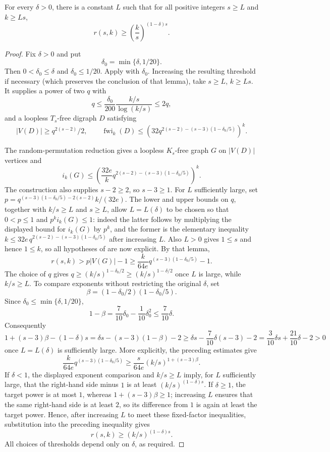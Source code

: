 \begin{theorem}
For every $\delta>0$, there is a constant $L$ such that for all positive
integers $s\geq L$ and $k\geq Ls$,
\[
 r(s,k)\geq\left(\frac{k}{s}\right)^{(1-\delta)s}.
\]
\end{theorem}
\begin{proof}
Fix $\delta>0$ and put
\[
 \delta_0=\min\{\delta,1/20\}.
\]
Then $0<\delta_0\leq\delta$ and $\delta_0\leq1/20$.  Apply
 with $\delta_0$.  Increasing the resulting
threshold if necessary (which preserves the conclusion of that lemma), take
$s\geq L$, $k\geq Ls$.  It supplies a power of two $q$
with
\[
 q\leq\frac{\delta_0}{200}\frac{k/s}{\log(k/s)}\leq2q,
\]
and a loopless $T_s$-free digraph $D$ satisfying
\[
 |V(D)|\geq q^{2(s-2)}/2,\qquad
 \operatorname{fwi}_k(D)\leq
 \left(32q^{2(s-2)-(s-3)(1-\delta_0/5)}\right)^k.
\]

The random-permutation reduction  gives a
loopless $K_s$-free graph $G$ on $|V(D)|$ vertices and
\[
 i_k(G)\leq
 \left(\frac{32e}{k}
 q^{2(s-2)-(s-3)(1-\delta_0/5)}\right)^k.
\]
The construction also supplies $s-2\geq2$, so $s-3\geq1$.
For $L$ sufficiently large, set
$p=q^{(s-3)(1-\delta_0/5)-2(s-2)}k/(32e)$.
The lower and upper bounds on $q$, together with $k/s\geq L$ and
$s\geq L$, allow $L=L(\delta)$ to be chosen so that $0<p\leq1$ and
$p^ki_k(G)\leq1$: indeed the latter follows by multiplying the displayed
bound for $i_k(G)$ by $p^k$, and the former is the elementary inequality
$k\leq32e\,q^{2(s-2)-(s-3)(1-\delta_0/5)}$ after increasing $L$.
Also $L>0$ gives $1\leq s$ and hence $1\leq k$, so all hypotheses of
 are now explicit.  By that lemma,
\[
 r(s,k)>p|V(G)|-1
 \geq\frac{k}{64e}q^{(s-3)(1-\delta_0/5)}-1.
\]
The choice of $q$ gives
$q\geq(k/s)^{1-\delta_0/2}\geq(k/s)^{1-\delta/2}$ once $L$ is large,
while $k/s\geq L$.  To compare exponents without restricting the original
$\delta$, set
\[
 \beta=(1-\delta_0/2)(1-\delta_0/5).
\]
Since $\delta_0\leq\min\{\delta,1/20\}$,
\[
 1-\beta=\frac7{10}\delta_0-\frac1{10}\delta_0^2
 \leq\frac7{10}\delta.
\]
Consequently
\[
 1+(s-3)\beta-(1-\delta)s
 =\delta s-(s-3)(1-\beta)-2
 \geq\delta s-\frac7{10}\delta(s-3)-2
 =\frac3{10}\delta s+\frac{21}{10}\delta-2>0
\]
once $L=L(\delta)$ is sufficiently large.
More explicitly, the preceding estimates give
\[
 \frac{k}{64e}q^{(s-3)(1-\delta_0/5)}
 \geq \frac{s}{64e}(k/s)^{1+(s-3)\beta}.
\]
If $\delta<1$, the displayed exponent comparison and $k/s\geq L$ imply,
for $L$ sufficiently large, that the right-hand side minus $1$ is at least
$(k/s)^{(1-\delta)s}$.  If $\delta\geq1$, the target power is at most $1$,
whereas $1+(s-3)\beta\geq1$; increasing $L$ ensures that the same right-hand
side is at least $2$, so its difference from $1$ is again at least the target
power.  Hence, after increasing $L$ to meet these fixed-factor inequalities,
substitution into the preceding inequality gives
\[
 r(s,k)\geq(k/s)^{(1-\delta)s}.
\]
All choices of thresholds depend only on $\delta$, as required.
\end{proof}
